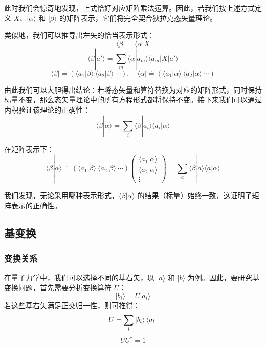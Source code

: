 此时我们会惊奇地发现，上式恰好对应矩阵乘法运算。因此，若我们按上述方式定义 $X$、$|\alpha\rangle$ 和 $|\beta\rangle$ 的矩阵表示，它们将完全契合狄拉克态矢量理论。

类似地，我们可以推导出左矢的恰当表示形式：
\begin{equation}
	\langle \beta| = \langle \alpha| X
\end{equation}
\begin{equation}
	\langle \beta| a'\rangle = \sum_m \langle \alpha| a_m \rangle \langle a_m | X | a' \rangle
\end{equation}
\begin{equation}
	\langle \beta| \doteq \left( \langle a_1 | \beta \rangle \ \langle a_2 | \beta \rangle \ \cdots \right), \quad
	\langle \alpha| \doteq \left( \langle a_1 | \alpha \rangle \ \langle a_2 | \alpha \rangle \ \cdots \right)
\end{equation}

由此我们可以大胆得出结论：若将态矢量和算符替换为对应的矩阵形式，同时保持标量不变，那么态矢量理论中的所有方程形式都将保持不变。接下来我们可以通过内积验证该理论的正确性：
\begin{equation}
	\langle \beta | \alpha \rangle = \sum_i \langle \beta | a_i \rangle \langle a_i | \alpha \rangle
\end{equation}

在矩阵表示下：
\begin{equation}
	\langle \beta | \alpha \rangle \doteq \left( \langle a_1 | \beta \rangle \ \langle a_2 | \beta \rangle \ \cdots \right) \begin{pmatrix}
		\langle a_1 | \alpha \rangle \\
		\langle a_2 | \alpha \rangle \\
		\vdots
	\end{pmatrix} = \sum_a \langle \beta | a \rangle \langle a | \alpha \rangle
\end{equation}

我们发现，无论采用哪种表示形式，$\langle \beta | \alpha \rangle$ 的结果（标量）始终一致，这证明了矩阵表示的正确性。

\subsection{基变换}
\subsubsection{变换关系}

在量子力学中，我们可以选择不同的基右矢，以 $|a\rangle$ 和 $|b\rangle$ 为例。因此，要研究基变换问题，首先需要分析变换算符 $U$：
\begin{equation}
	|b_i \rangle = U |a_i \rangle
\end{equation}
若这些基右矢满足正交归一性，则可推得：
\begin{equation}
	U = \sum_{l} \ket{b_{l}} \bra{a_{l}}
\end{equation}
\begin{equation}
	UU^{\dagger} = 1
\end{equation}

